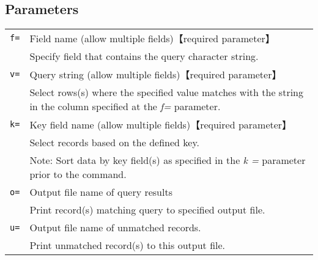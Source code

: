 \documentclass[a4paper]{jarticle}
\begin{document}
\subsection*{Parameters}
\begin{table}[htbp]
{\small
\begin{tabular}{ll}
\verb|f=|    & Field name (allow multiple fields)【required parameter】\\
& Specify field that contains the query character string. \\
\verb|v=|    & Query string  (allow multiple fields)【required parameter】 \\
& Select rows(s) where the specified value matches with the string in the column specified at the \emph{f=} parameter. \\
\verb|k=|    & Key field name (allow multiple fields)【required parameter】 \\
& Select records based on the defined key. \\
& Note: Sort data by key field(s) as specified in the \emph{k =} parameter prior to the command. \\
\verb|o=|    & Output file name of query results  \\
& Print record(s) matching query to specified output file.  \\
\verb|u=|    & Output file name of unmatched records.  \\
& Print unmatched record(s) to this output file. \\
\end{tabular} 
}
\end{table} 
\end{document}
